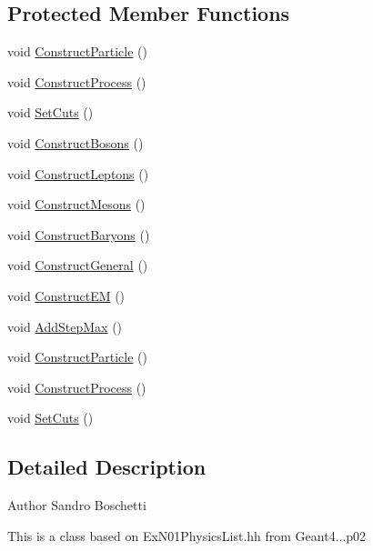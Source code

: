 \subsection*{Protected Member Functions}
\begin{DoxyCompactItemize}
\item 
void \hyperlink{class_physics_list_af7906507122c985d2da3e61c56efe60e}{Construct\-Particle} ()
\item 
void \hyperlink{class_physics_list_a9c08bc28eba2ae62104b967280901a3f}{Construct\-Process} ()
\item 
void \hyperlink{class_physics_list_a0ba901b82ae30657b109930645fe8017}{Set\-Cuts} ()
\item 
void \hyperlink{class_physics_list_ab7158dbb73a310fc99331005277502b5}{Construct\-Bosons} ()
\item 
void \hyperlink{class_physics_list_ab55f046b278d5c02b8c83aaa332504ec}{Construct\-Leptons} ()
\item 
void \hyperlink{class_physics_list_a2d4d082da733c65153a801a7c70a276e}{Construct\-Mesons} ()
\item 
void \hyperlink{class_physics_list_a628054b8fcfbd759d3f1a65b1eba7e01}{Construct\-Baryons} ()
\item 
void \hyperlink{class_physics_list_a413551cc4da5cac5b51a462493890a0a}{Construct\-General} ()
\item 
void \hyperlink{class_physics_list_a42728fc670ddaf9404a9e023f5843c73}{Construct\-E\-M} ()
\item 
void \hyperlink{class_physics_list_a07ed38b92ebee0aedbecfb09a4baf50f}{Add\-Step\-Max} ()
\item 
void \hyperlink{class_physics_list_af7906507122c985d2da3e61c56efe60e}{Construct\-Particle} ()
\item 
void \hyperlink{class_physics_list_a9c08bc28eba2ae62104b967280901a3f}{Construct\-Process} ()
\item 
void \hyperlink{class_physics_list_a0ba901b82ae30657b109930645fe8017}{Set\-Cuts} ()
\end{DoxyCompactItemize}


\subsection{Detailed Description}
\begin{DoxyAuthor}{Author}
Sandro Boschetti
\end{DoxyAuthor}
This is a class based on Ex\-N01\-Physics\-List.\-hh from Geant4...\-p02 

